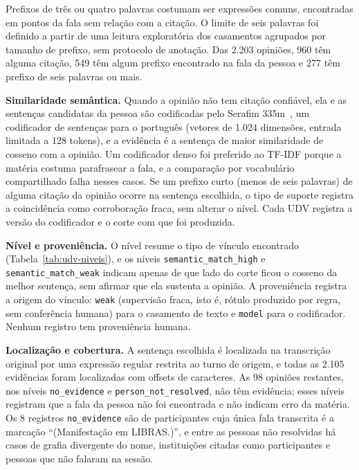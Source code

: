 Prefixos de três ou quatro palavras costumam ser expressões comuns, encontradas em pontos da fala sem
relação com a citação. O limite de seis palavras foi definido a partir de uma leitura exploratória
dos casamentos agrupados por tamanho de prefixo, sem protocolo de anotação. Das 2.203 opiniões, 960
têm alguma citação, 549 têm algum prefixo encontrado na fala da pessoa e 277 têm prefixo de seis
palavras ou mais.

\textbf{Similaridade semântica.} Quando a opinião não tem citação confiável, ela e as sentenças
candidatas da pessoa são codificadas pelo Serafim 335m~\citep{gomes2024serafim}, um codificador de
sentenças para o português (vetores de 1.024 dimensões, entrada limitada a 128 tokens), e a
evidência é a sentença de maior similaridade de cosseno com a opinião. Um codificador denso foi
preferido ao TF-IDF porque a matéria costuma parafrasear a fala, e a comparação por vocabulário
compartilhado falha nesses casos. Se um prefixo curto (menos de seis palavras) de alguma citação da
opinião ocorre na sentença escolhida, o tipo de suporte registra a coincidência como corroboração
fraca, sem alterar o nível. Cada UDV registra a versão do codificador e o corte com que foi
produzida.

\textbf{Nível e proveniência.} O nível resume o tipo de vínculo encontrado
(Tabela~\ref{tab:udv-niveis}), e os níveis \texttt{semantic\_match\_high} e
\texttt{semantic\_match\_weak} indicam apenas de que lado do corte ficou o cosseno da melhor
sentença, sem afirmar que ela sustenta a opinião. A proveniência registra a origem do vínculo:
\texttt{weak} (supervisão fraca, isto é, rótulo produzido por regra, sem conferência humana) para o
casamento de texto e \texttt{model} para o codificador. Nenhum registro tem proveniência humana.

\textbf{Localização e cobertura.} A sentença escolhida é localizada na transcrição original por uma
expressão regular restrita ao turno de origem, e todas as 2.105 evidências foram localizadas com
offsets de caracteres. As 98 opiniões restantes, nos níveis \texttt{no\_evidence} e
\texttt{person\_not\_resolved}, não têm evidência; esses níveis registram que a fala da pessoa não
foi encontrada e não indicam erro da matéria. Os 8 registros \texttt{no\_evidence} são de
participantes cuja única fala transcrita é a marcação ``(Manifestação em LIBRAS.)'', e entre as
pessoas não resolvidas há casos de grafia divergente do nome, instituições citadas como
participantes e pessoas que não falaram na sessão.

